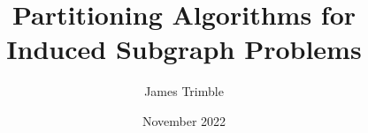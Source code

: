 \documentclass[oneside,hidelinks,nogutter]{glasgowthesis}
\begin{document}
\pagestyle{empty}

\title{Partitioning Algorithms for Induced Subgraph Problems}
\author{James Trimble}
\date{November 2022}

\maketitle

\cleardoublepage

 

% 

% 

\cleardoublepage
\vspace*{1.75in}








\tableofcontents


\cleardoublepage
\pagestyle{fancy}
\setcounter{page}{1}

\nobibliography*

%
\end{document}
